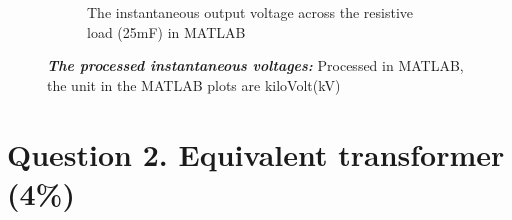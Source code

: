 \documentclass[12pt]{report} %
\begin{document}
\begin{figure}[H]
\begin{subfigure}[b]{\textwidth}
        \caption{The instantaneous output voltage across the resistive load (25mF) in MATLAB}
        \label{fig:Q1MATLABsub3}
    \end{subfigure} 
    \caption[The processed instantaneous voltage measurements in MATLAB]
    {\centering \textit{\textbf{The processed instantaneous voltages:}} Processed in MATLAB, the unit in the MATLAB plots are kiloVolt(kV)}
    \label{fig:Q1MATLAB}
\end{figure}
\newpage


\section{Question 2. Equivalent transformer (4\%)} 
\end{document}
